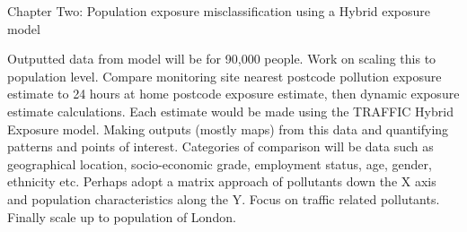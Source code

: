 Chapter Two: Population exposure misclassification using a Hybrid exposure model

Outputted data from model will be for 90,000 people. Work on scaling this to population level. Compare monitoring site nearest postcode pollution exposure estimate to 24 hours at home postcode exposure estimate, then dynamic exposure estimate calculations. Each estimate would be made using the TRAFFIC Hybrid Exposure model. Making outputs (mostly maps) from this data and quantifying patterns and points of interest. Categories of comparison will be data such as geographical location, socio-economic grade, employment status, age, gender, ethnicity etc. Perhaps adopt a matrix approach of pollutants down the X axis and population characteristics along the Y. Focus on traffic related pollutants. Finally scale up to population of London.
